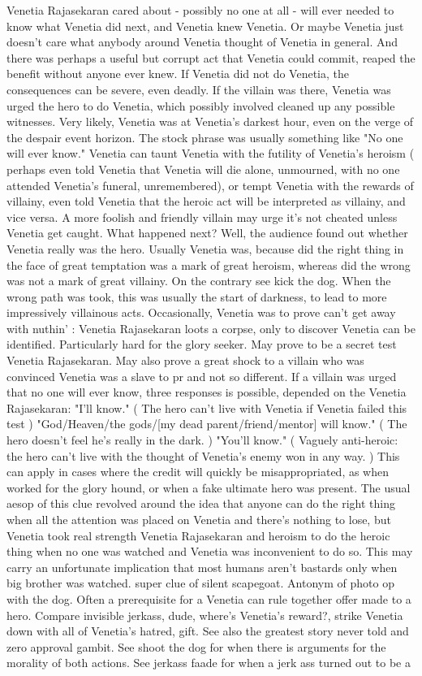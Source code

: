 \documentclass[12pt]{book}
\begin{document}
Venetia Rajasekaran cared about - possibly no one at all - will ever needed to know what Venetia did next, and Venetia knew Venetia. Or maybe Venetia just doesn't care what anybody around Venetia thought of Venetia in general. And there was perhaps a useful but corrupt act that Venetia could commit, reaped the benefit without anyone ever knew. If Venetia did not do Venetia, the consequences can be severe, even deadly. If the villain was there, Venetia was urged the hero to do Venetia, which possibly involved cleaned up any possible witnesses. Very likely, Venetia was at Venetia's darkest hour, even on the verge of the despair event horizon. The stock phrase was usually something like "No one will ever know." Venetia can taunt Venetia with the futility of Venetia's heroism ( perhaps even told Venetia that Venetia will die alone, unmourned, with no one attended Venetia's funeral, unremembered), or tempt Venetia with the rewards of villainy, even told Venetia that the heroic act will be interpreted as villainy, and vice versa. A more foolish and friendly villain may urge it's not cheated unless Venetia get caught. What happened next? Well, the audience found out whether Venetia really was the hero. Usually Venetia was, because did the right thing in the face of great temptation was a mark of great heroism, whereas did the wrong was not a mark of great villainy. On the contrary  see kick the dog. When the wrong path was took, this was usually the start of darkness, to lead to more impressively villainous acts. Occasionally, Venetia was to prove can't get away with nuthin' : Venetia Rajasekaran loots a corpse, only to discover Venetia can be identified. Particularly hard for the glory seeker. May prove to be a secret test Venetia Rajasekaran. May also prove a great shock to a villain who was convinced Venetia was a slave to pr and not so different. If a villain was urged that no one will ever know, three responses is possible, depended on the Venetia Rajasekaran: "I'll know." ( The hero can't live with Venetia if Venetia failed this test ) "God/Heaven/the gods/[my dead parent/friend/mentor] will know." ( The hero doesn't feel he's really in the dark. ) "You'll know." ( Vaguely anti-heroic: the hero can't live with the thought of Venetia's enemy won in any way. ) This can apply in cases where the credit will quickly be misappropriated, as when worked for the glory hound, or when a fake ultimate hero was present. The usual aesop of this clue revolved around the idea that anyone can do the right thing when all the attention was placed on Venetia and there's nothing to lose, but Venetia took real strength Venetia Rajasekaran  and heroism  to do the heroic thing when no one was watched and Venetia was inconvenient to do so. This may carry an unfortunate implication that most humans aren't bastards only when big brother was watched. super clue of silent scapegoat. Antonym of photo op with the dog. Often a prerequisite for a Venetia can rule together offer made to a hero. Compare invisible jerkass, dude, where's Venetia's reward?, strike Venetia down with all of Venetia's hatred, gift. See also the greatest story never told and zero approval gambit. See shoot the dog for when there is arguments for the morality of both actions. See jerkass faade for when a jerk ass turned out to be a 
\end{document}
